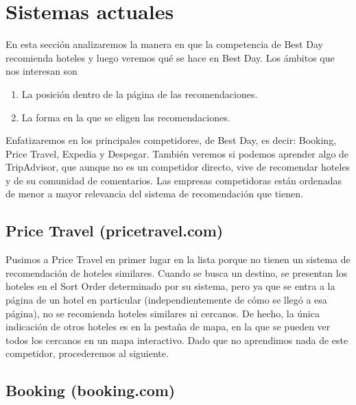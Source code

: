 \documentclass[12pt]{report}
\begin{document}
\section{Sistemas actuales}

En esta sección analizaremos la manera en que la competencia de Best Day recomienda hoteles y luego veremos qué se hace en Best Day. Los ámbitos que nos interesan son
\begin{enumerate}
	\item La posición dentro de la página de las recomendaciones.
	\item La forma en la que se eligen las recomendaciones.
\end{enumerate}
Enfatizaremos en los principales competidores, de Best Day, es decir: Booking, Price Travel, Expedia y Despegar. También veremos si podemos aprender algo de TripAdvisor, que aunque no es un competidor directo, vive de recomendar hoteles y de su comunidad de comentarios. Las empresas competidoras están ordenadas de menor a mayor relevancia del sistema de recomendación que tienen.

\subsection*{Price Travel (pricetravel.com)}

Pusimos a Price Travel en primer lugar en la lista porque no tienen un sistema de recomendación de hoteles similares. Cuando se busca un destino, se presentan los hoteles en el Sort Order determinado por su sistema, pero ya que se entra a la página de un hotel en particular (independientemente de cómo se llegó a esa página), no se recomienda hoteles similares ni cercanos. De hecho, la única indicación de otros hoteles es en la pestaña de mapa, en la que se pueden ver todos los cercanos en un mapa interactivo. Dado que no aprendimos nada de este competidor, procederemos al siguiente.

\subsection*{Booking (booking.com)}
\end{document}
